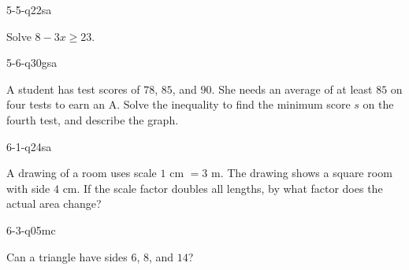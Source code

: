 \begin{practiceQuestion}{5-5-q22}{sa}
\begin{questionText}
Solve $8 - 3x \geq 23$.
\end{questionText}
\end{practiceQuestion}

\begin{practiceQuestion}{5-6-q30}{gsa}
\begin{questionText}
A student has test scores of $78$, $85$, and $90$. She needs an average of at least $85$ on four tests to earn an A. Solve the inequality to find the minimum score $s$ on the fourth test, and describe the graph.

\begin{center}
\end{center}
\end{questionText}
\end{practiceQuestion}

\begin{practiceQuestion}{6-1-q24}{sa}
\begin{questionText}
A drawing of a room uses scale $1$ cm $= 3$ m. The drawing shows a square room with side $4$ cm. If the scale factor doubles all lengths, by what factor does the actual area change?
\end{questionText}
\end{practiceQuestion}

\begin{practiceQuestion}{6-3-q05}{mc}
\begin{questionText}
Can a triangle have sides $6$, $8$, and $14$?
\end{questionText}
\end{practiceQuestion}

